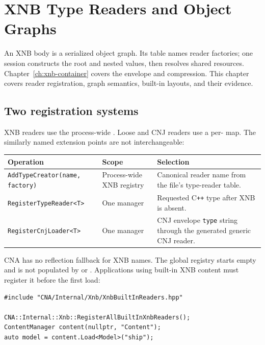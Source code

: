 \chapter{XNB Type Readers and Object Graphs}
\label{ch:xnb-type-readers}
\label{sec:xnb-and-cnj-model}

An XNB body is a serialized object graph. Its table names reader factories; one
 session constructs the root and nested values, then resolves shared
resources. Chapter~\ref{ch:xnb-container} covers the envelope and compression. This chapter
covers reader registration, graph semantics, built-in layouts, and their evidence.

\section{Two registration systems}

XNB readers use the process-wide . Loose and CNJ readers use a
per- map. The similarly named extension points are not interchangeable:

\begin{center}
\small
\begin{tabular}{@{}p{}p{}p{}@{}}
\toprule
\textbf{Operation} & \textbf{Scope} & \textbf{Selection} \\
\midrule
\texttt{AddTypeCreator(name, factory)} & Process-wide XNB registry & Canonical reader name from
  the file's type-reader table. \\
\texttt{RegisterTypeReader<T>} & One manager & Requested C\texttt{++} type after XNB is absent. \\
\texttt{RegisterCnjLoader<T>} & One manager & CNJ envelope \texttt{type} string through the
  generated generic CNJ reader. \\
\bottomrule
\end{tabular}
\end{center}

CNA has no reflection fallback for XNB names. The global registry starts empty and is not
populated by  or . Applications using built-in XNB
content must register it before the first load:

\begin{lstlisting}
#include "CNA/Internal/Xnb/XnbBuiltInReaders.hpp"

CNA::Internal::Xnb::RegisterAllBuiltInXnbReaders();
ContentManager content(nullptr, "Content");
auto model = content.Load<Model>("ship");
\end{lstlisting}

